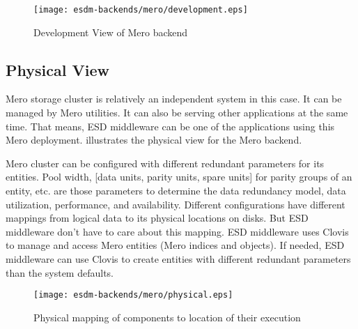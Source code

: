 \begin{figure}
	\centering
	\texttt{[image: esdm-backends/mero/development.eps]}
	\caption{Development View of Mero backend}
	\label{fig:mero backend development view}
\end{figure}


\subsection{Physical View}

Mero storage cluster is relatively an independent system in this case. It can be
managed by Mero utilities. It can also be serving other applications at the
same time. That means, ESD middleware can be one of the applications using
this Mero deployment.
 illustrates the physical view for the Mero backend.

Mero cluster can be configured with different redundant parameters for its
entities. Pool width, [data units, parity units, spare units] for parity
groups of an entity, etc. are those parameters to determine the data redundancy
model, data utilization, performance, and availability. Different configurations
have different mappings from logical data to its physical locations on disks.
But ESD middleware don't have to care about this mapping. ESD middleware uses
Clovis to manage and access Mero entities (Mero indices and objects).
If needed, ESD middleware can use Clovis to create entities with different redundant parameters than the system defaults.

\begin{figure}
	\centering
	\texttt{[image: esdm-backends/mero/physical.eps]}
	\caption{Physical mapping of components to location of their execution}
	\label{fig:backend mero physical view}
\end{figure}

